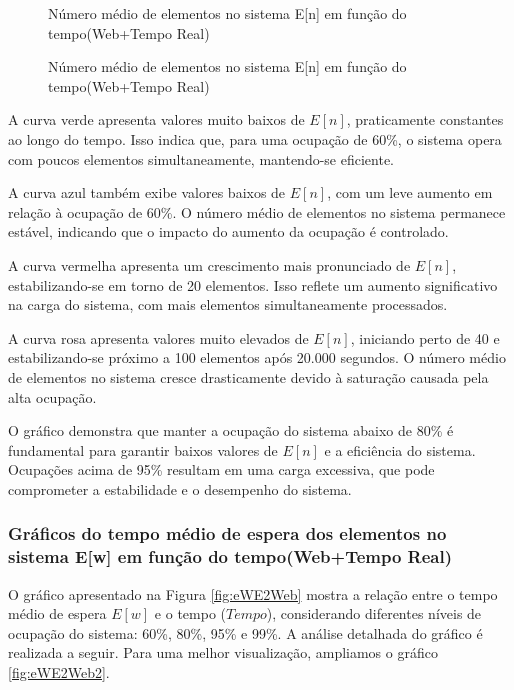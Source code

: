 \begin{figure}[h!]
   \centering
   
   \caption{Número médio de elementos no sistema E[n] em função do tempo(Web+Tempo Real)}
   \label{fig:eNE2Web}
\end{figure}
\begin{figure}[h!]
   \centering
   
   \caption{Número médio de elementos no sistema E[n] em função do tempo(Web+Tempo Real)}
   \label{fig:eNE2Web2}
\end{figure}

A curva verde apresenta valores muito baixos de $E[n]$, praticamente constantes ao longo do tempo.
Isso indica que, para uma ocupação de 60\%, o sistema opera com poucos elementos simultaneamente, mantendo-se eficiente.

A curva azul também exibe valores baixos de $E[n]$, com um leve aumento em relação à ocupação de 60\%. O número médio de elementos no sistema permanece estável, indicando que o impacto do aumento da ocupação é controlado.

A curva vermelha apresenta um crescimento mais pronunciado de $E[n]$, estabilizando-se em torno de 20 elementos. Isso reflete um aumento significativo na carga do sistema, com mais elementos simultaneamente processados.

A curva rosa apresenta valores muito elevados de $E[n]$, iniciando perto de 40 e estabilizando-se próximo a 100 elementos após 20.000 segundos. O número médio de elementos no sistema cresce drasticamente devido à saturação causada pela alta ocupação.

O gráfico demonstra que manter a ocupação do sistema abaixo de 80\% é fundamental para garantir baixos valores de $E[n]$ e a eficiência do sistema. Ocupações acima de 95\% resultam em uma carga excessiva, que pode comprometer a estabilidade e o desempenho do sistema.


\subsubsection{Gráficos do tempo médio de espera dos elementos no sistema E[w] em função do tempo(Web+Tempo Real)}
O gráfico apresentado na Figura \ref{fig:eWE2Web} mostra a relação entre o tempo médio de espera $E[w]$ e o tempo ($Tempo$), considerando diferentes níveis de ocupação do sistema: 60\%, 80\%, 95\% e 99\%. A análise detalhada do gráfico é realizada a seguir. Para uma melhor visualização, ampliamos o gráfico \ref{fig:eWE2Web2}.

